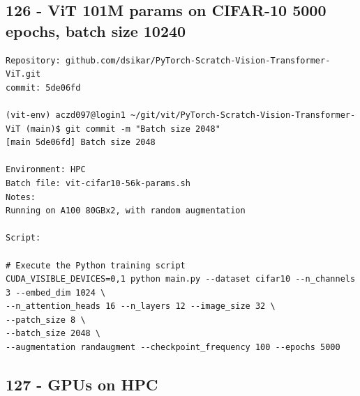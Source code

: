 \subsection{126 - ViT 101M params on CIFAR-10 5000 epochs, batch size 10240}
\label{app_res:126}

\begin{verbatim}
Repository: github.com/dsikar/PyTorch-Scratch-Vision-Transformer-ViT.git
commit: 5de06fd

(vit-env) aczd097@login1 ~/git/vit/PyTorch-Scratch-Vision-Transformer-ViT (main)$ git commit -m "Batch size 2048"
[main 5de06fd] Batch size 2048

Environment: HPC 
Batch file: vit-cifar10-56k-params.sh
Notes: 
Running on A100 80GBx2, with random augmentation

Script:

# Execute the Python training script
CUDA_VISIBLE_DEVICES=0,1 python main.py --dataset cifar10 --n_channels 3 --embed_dim 1024 \
--n_attention_heads 16 --n_layers 12 --image_size 32 \
--patch_size 8 \
--batch_size 2048 \
--augmentation randaugment --checkpoint_frequency 100 --epochs 5000
\end{verbatim}

\subsection{127 - GPUs on HPC}
\label{app_res:127}

